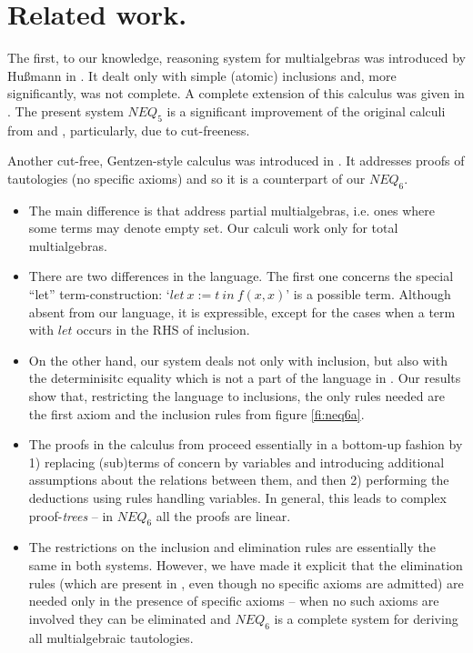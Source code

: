\documentclass[10pt]{article}
\begin{document}






\section{Related work.}\label{se:related}
The first, to our knowledge, reasoning system for multialgebras was introduced 
by Hu{\ss}mann in
\cite{Hus}. It dealt only with simple (atomic) inclusions and, more significantly, 
was not complete.
A complete extension of this calculus was given in \cite{Mich}.
The present system $NEQ_5$ is a significant improvement of the original
calculi from \cite{Mich} and \cite{Top}, particularly, due to cut-freeness.

Another cut-free, Gentzen-style calculus was introduced in \cite{BK95}.
It addresses proofs of tautologies (no specific axioms) and so it is a counterpart
of our $NEQ_6$.
\begin{itemize}\MyLPar
\item 
The main difference is that \cite{BK95} address partial multialgebras, i.e. ones where
some terms may denote empty set. Our calculi work only for total multialgebras. 
\item
There are two differences in the language. The first one concerns
the special ``let'' term-construction: `$let\ x:=t\ in\ f(x,x)$' is a possible term. 
Although absent from our language, it is
expressible, except for the cases when a term with $let$ occurs in the RHS
of inclusion. 
\item 
On the other hand, our system
deals not only with inclusion, but also with the determinisitc equality which
is not a part of the language in \cite{BK95}.
Our results show that, restricting the language to inclusions, 
the only rules needed are the first axiom and the inclusion rules
from figure \ref{fi:neq6a}.
\item
The proofs in the calculus from \cite{BK95} proceed essentially in a bottom-up 
fashion by 1) replacing (sub)terms of concern by variables and introducing 
additional assumptions about the relations between them, and then 2) performing 
the deductions using rules handling variables. In general, this leads to complex
proof-{\em trees} -- in $NEQ_6$ all the proofs are linear.
\item
The restrictions on the inclusion and elimination rules are essentially the same
in both systems.
However, we have
made it explicit that the elimination rules (which are present in \cite{BK95}, 
even though no specific axioms are admitted)
are needed only in the presence of 
specific axioms -- when no such axioms are involved they can be eliminated and $NEQ_6$
is a complete system for deriving all multialgebraic tautologies.
\end{itemize}
\end{document}
